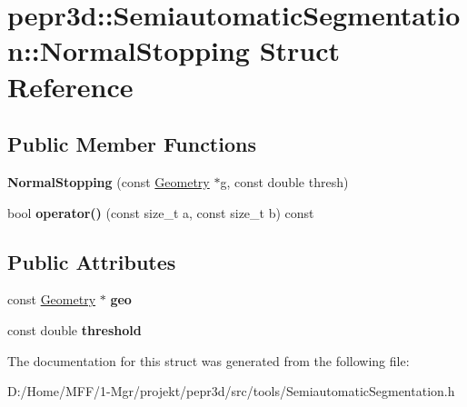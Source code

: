 \hypertarget{structpepr3d_1_1_semiautomatic_segmentation_1_1_normal_stopping}{}\section{pepr3d\+::Semiautomatic\+Segmentation\+::Normal\+Stopping Struct Reference}
\label{structpepr3d_1_1_semiautomatic_segmentation_1_1_normal_stopping}
\subsection*{Public Member Functions}
\begin{DoxyCompactItemize}
\item 
\mbox{\label{structpepr3d_1_1_semiautomatic_segmentation_1_1_normal_stopping_a725367fe48e8877e92b84e478dc4609f}} 
{\bfseries Normal\+Stopping} (const \mbox{\hyperlink{classpepr3d_1_1_geometry}{Geometry}} $\ast$g, const double thresh)
\item 
\mbox{\label{structpepr3d_1_1_semiautomatic_segmentation_1_1_normal_stopping_a3c70191daf3fba43f9d76c4eaa8837bb}} 
bool {\bfseries operator()} (const size\+\_\+t a, const size\+\_\+t b) const
\end{DoxyCompactItemize}
\subsection*{Public Attributes}
\begin{DoxyCompactItemize}
\item 
\mbox{\label{structpepr3d_1_1_semiautomatic_segmentation_1_1_normal_stopping_a86816219b14ac1b44d4abacc188d8673}} 
const \mbox{\hyperlink{classpepr3d_1_1_geometry}{Geometry}} $\ast$ {\bfseries geo}
\item 
\mbox{\label{structpepr3d_1_1_semiautomatic_segmentation_1_1_normal_stopping_a194134abb7e778168aaf77a7f4b36c7c}} 
const double {\bfseries threshold}
\end{DoxyCompactItemize}


The documentation for this struct was generated from the following file\+:\begin{DoxyCompactItemize}
\item 
D\+:/\+Home/\+M\+F\+F/1-\/\+Mgr/projekt/pepr3d/src/tools/Semiautomatic\+Segmentation.\+h\end{DoxyCompactItemize}
